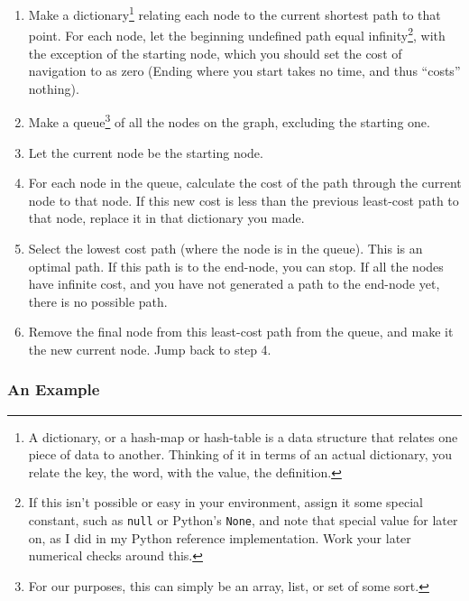 \documentclass[letterpaper, 12pt]{article}
\begin{document}
\begin{multicols}{2}
\begin{enumerate}
    \item Make a dictionary\footnote{A dictionary, or a hash-map or hash-table
          is a data structure that relates one piece of data to another.
          Thinking of it in terms of an actual dictionary, you relate the key,
          the word, with the value, the definition.} relating each node to the
          current shortest path to that point. For each node, let the beginning
          undefined path equal infinity\footnote{If this isn't possible or
          easy in your environment, assign it some special constant, such as
          \texttt{null} or Python's \texttt{None}, and note that special value
          for later on, as I did in my Python reference implementation. Work
          your later numerical checks around this.}, with the exception of the
          starting node, which you should set the cost of navigation to as zero
          (Ending where you start takes no time, and thus ``costs'' nothing).
    \item Make a queue\footnote{For our purposes, this can simply be an array,
          list, or set of some sort.} of all the nodes on the graph, excluding
          the starting one.
    \item Let the current node be the starting node.
    \item For each node in the queue, calculate the cost of the path through the
          current node to that node. If this new cost is less than the previous
          least-cost path to that node, replace it in that dictionary you made.
    \item Select the lowest cost path (where the node is in the queue). This is
          an optimal path. If this path is to the end-node, you can stop. If all
          the nodes have infinite cost, and you have not generated a path to the
          end-node yet, there is no possible path.
    \item Remove the final node from this least-cost path from the queue, and
          make it the new current node. Jump back to step 4.
\end{enumerate}

\subsubsection{An Example}


\end{multicols}
\end{document}
